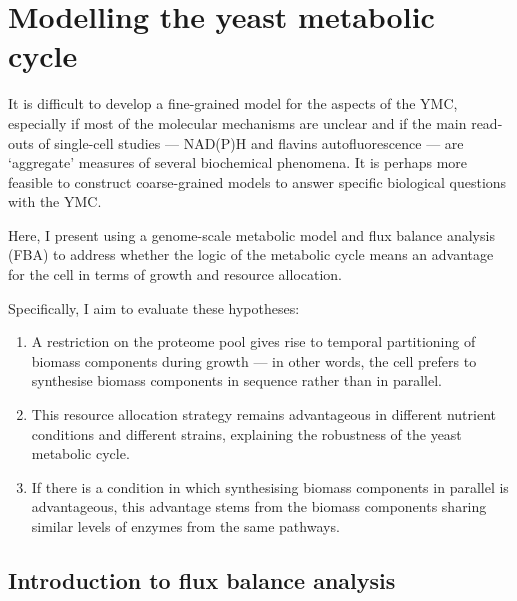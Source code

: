 \chapter{Modelling the yeast metabolic cycle}
\label{ch:model}

It is difficult to develop a fine-grained model for the aspects of the YMC,
especially if most of the molecular mechanisms are unclear
and if the main read-outs of single-cell studies --- NAD(P)H and flavins autofluorescence --- are `aggregate' measures of several biochemical phenomena.
It is perhaps more feasible to construct coarse-grained models to answer specific biological questions with the YMC.

Here, I present using a genome-scale metabolic model and flux balance analysis (FBA) to address whether the logic of the metabolic cycle means an advantage for the cell in terms of growth and resource allocation.

Specifically, I aim to evaluate these hypotheses:
\begin{enumerate}
  \item A restriction on the proteome pool gives rise to temporal partitioning of biomass components during growth --- in other words, the cell prefers to synthesise biomass components in sequence rather than in parallel.
  \item This resource allocation strategy remains advantageous in different nutrient conditions and different strains, explaining the robustness of the yeast metabolic cycle.
  \item If there is a condition in which synthesising biomass components in parallel is advantageous, this advantage stems from the biomass components sharing similar levels of enzymes from the same pathways.
\end{enumerate}

\section{Introduction to flux balance analysis}
\label{sec:model-fba}

